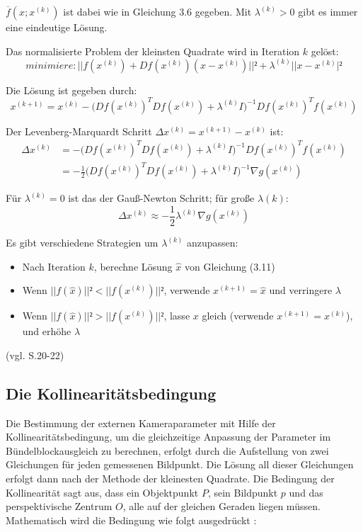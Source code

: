 $\overline{f}(x;x^{(k)})$ ist dabei wie in Gleichung 3.6 gegeben. Mit $\lambda^{(k)} > 0$ gibt es immer eine eindeutige Lösung.

Das normalisierte Problem der kleinsten Quadrate wird in Iteration $k$ gelöst:
\begin{equation}
minimiere: ||f(x^{(k)}) + Df(x^{(k)})(x-x^{(k)})||² + \lambda^{(k)}||x-x^{(k)}|²
\end{equation}

Die Lösung ist gegeben durch:
\begin{equation}
x^{(k+1)} = x^{(k)} -\Big(Df(x^{(k)})^TDf(x^{(k)})+\lambda^{(k)}I\Big)^{-1} Df(x^{(k)})^T f(x^{(k)})
\end{equation}

Der Levenberg-Marquardt Schritt $\Delta x^{(k)} = x^{(k+1)} - x^{(k)}$ ist:
\begin{equation}
\begin{aligned}
\Delta x^{(k)} &= -\Big(Df(x^{(k)})^TDf(x^{(k)})+\lambda^{(k)}I\Big)^{-1} Df(x^{(k)})^T f(x^{(k)})\\ &= -\frac{1}{2} \Big(Df(x^{(k)})^TDf(x^{(k)})+\lambda^{(k)}I\Big)^{-1} \nabla g(x^{(k)})
\end{aligned}
\end{equation}

Für $\lambda^{(k)}=0$ ist das der Gauß-Newton Schritt; für große $\lambda{(k)}$:
\begin{equation}
\Delta x^{(k)} \approx -\frac{1}{2}\lambda^{(k)}\nabla g(x^{(k)})
\end{equation}

Es gibt verschiedene Strategien um $\lambda^{(k)}$ anzupassen:

\begin{itemize}
\item Nach Iteration $k$, berechne Lösung $\hat{x}$ von Gleichung (3.11)
\item Wenn $||f(\hat{x})||²<||f(x^{(k)})||²$, verwende $x^{(k+1)} = \hat{x}$ und verringere $\lambda$
\item Wenn $||f(\hat{x})||²>||f(x^{(k)})||²$, lasse $x$ gleich (verwende $x^{(k+1)} = x^{(k)}$), und erhöhe $\lambda$
\end{itemize}
(vgl. \cite{nonlinear_1} S.20-22)


\subsection{Die Kollinearitätsbedingung}

Die Bestimmung der externen Kameraparameter mit Hilfe der Kollinearitätsbedingung, um die gleichzeitige Anpassung der Parameter im Bündelblockausgleich zu berechnen, erfolgt durch die Aufstellung von zwei Gleichungen für jeden gemessenen Bildpunkt. Die Lösung all dieser Gleichungen erfolgt dann nach der Methode der kleinesten Quadrate. Die Bedingung der Kollinearität sagt aus, dass ein Objektpunkt $P$, sein Bildpunkt $p$ und das perspektivische Zentrum $O$, alle auf der gleichen Geraden liegen müssen. Mathematisch wird die Bedingung wie folgt ausgedrückt  \cite{coll_exterior}:

